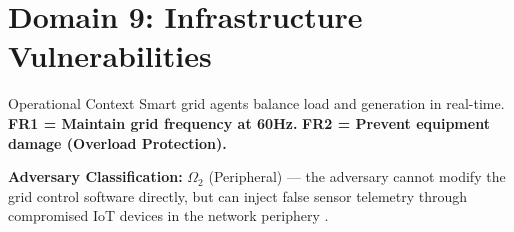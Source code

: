 \documentclass[
  ignorenonframetext,
]{beamer}
\author{\texorpdfstring{}{}}
\date{}
\begin{document}
\section{Domain 9: Infrastructure
Vulnerabilities}\label{sec:domain_infrastructure}

\begin{frame}[allowframebreaks]{Operational Context}
\protect{}\label{operational-context}
Smart grid agents balance load and generation in real-time. \textbf{FR1
= Maintain grid frequency at 60Hz.} \textbf{FR2 = Prevent equipment
damage (Overload Protection).}

\textbf{Adversary Classification:} \(\Omega_2\) (Peripheral) --- the
adversary cannot modify the grid control software directly, but can
inject false sensor telemetry through compromised IoT devices in the
network periphery \cite{friedman2026cogsec1}.
\end{frame}
\end{document}
